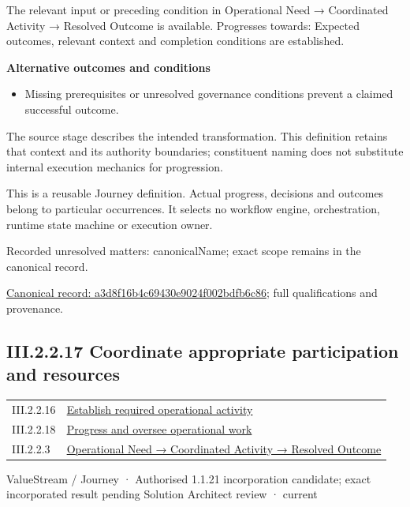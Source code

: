 The relevant input or preceding condition in Operational Need → Coordinated Activity → Resolved Outcome is available. Progresses towards: Expected outcomes, relevant context and completion conditions are established.



\par\medskip\textbf{Alternative outcomes and conditions}\par


\begin{itemize}


\item Missing prerequisites or unresolved governance conditions prevent a claimed successful outcome.

\end{itemize}


The source stage describes the intended transformation. This definition retains that context and its authority boundaries; constituent naming does not substitute internal execution mechanics for progression.



This is a reusable Journey definition. Actual progress, decisions and outcomes belong to particular occurrences. It selects no workflow engine, orchestration, runtime state machine or execution owner.


{\small Recorded unresolved matters: canonicalName; exact scope remains in the canonical record.}\par
{\footnotesize \href{../../../../continuum/strategy/value-stream/a3d8f16b4c69430e9024f002bdfb6c86.md}{Canonical record: a3d8f16b4c69430e9024f002bdfb6c86}; full qualifications and provenance.}\par
\subsection*{III.2.2.17 Coordinate appropriate participation and resources}
\label{navigation:III.2.2.17}

\begin{longtable}{p{.22\linewidth}p{.73\linewidth}}
III.2.2.16 & \hyperref[element:a3d8f16b4c69430e9024f002bdfb6c86]{Establish required operational activity} \\
III.2.2.18 & \hyperref[element:b404dffef05e4f2bb9d414e4d1ed33af]{Progress and oversee operational work} \\
III.2.2.3 & \hyperref[element:beea615ca7b34bbcbd0ad3a2a6ab2cff]{Operational Need → Coordinated Activity → Resolved Outcome} \\
\end{longtable}
\label{element:429446296e4b4a64a11b1b3d8385b12e}
{\small ValueStream / Journey · Authorised 1.1.21 incorporation candidate; exact incorporated result pending Solution Architect review · current}\par

